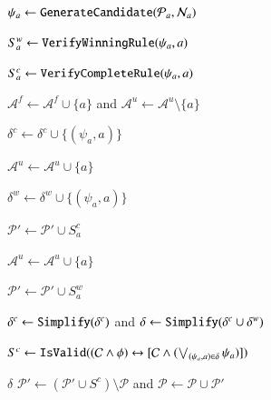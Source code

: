 \documentclass[review]{elsarticle}
\newcommand{\set}[1]{\{ #1 \}}
\newcommand{\true}{\top}
\newcommand{\false}{\bot}
\newcommand{\positiveSet}{\mathcal{P}}
\newcommand{\negativeSet}{\mathcal{N}}
\newcommand{\act}{\mathcal{A}}
\newcommand{\constraint}{\mathcal{C}}
\newcommand{\assign}{\leftarrow}
\begin{document}
\begin{algorithm}[htbp]
{{			$\psi_a \assign {\tt GenerateCandidate}(\positiveSet_a, \negativeSet_a)$
						
			
			$S^w_a \assign {\tt VerifyWinningRule}(\psi_a, a)$
			
			{
				$S^c_a \assign {\tt VerifyCompleteRule}(\psi_a, a)$
				
				{					
					$\act^f \assign \act^f \cup \set{a}$ and $\act^u \assign \act^u \setminus \set{a}$
					
					$\delta^c \assign \delta^c \cup \set{(\psi_a, a)}$
				\vspace*{-1mm}}
				\Else
				{
					$\act^u \assign \act^u \cup \set{a}$
					
					$\delta^w \assign \delta^w \cup \set{(\psi_a, a)}$ 
					
					$\positiveSet' \assign \positiveSet' \cup S^c_a$
				\vspace*{-1mm}}
			\vspace*{-1mm}}
			{
				$\act^u \assign \act^u \cup \set{a}$
				
				$\positiveSet' \assign \positiveSet' \cup S^w_a$
			\vspace*{-1mm}}
		\vspace*{-1mm}}
		
		
		$\delta^c \assign  {\tt Simplify}(\delta^c)$ and $\delta \assign {\tt Simplify}(\delta^c \cup \delta^w)$
		
		$S^c \assign {\tt IsValid}((\constraint \land \phi) \leftrightarrow [\constraint \land (\bigvee_{(\psi_a, a) \in \delta} \psi_a)])$		
		
		{	
			\Return $\delta$
		}
		\lElse
		{
			$\positiveSet' \assign (\positiveSet' \cup S^c) \setminus \positiveSet$ and	$\positiveSet \assign \positiveSet \cup \positiveSet'$
		}
	}
\end{algorithm}
\end{document}
